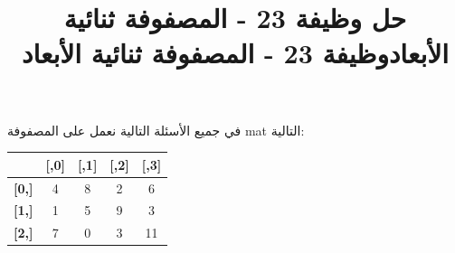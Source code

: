 \documentclass[14pt]{extarticle}
\title{حل وظيفة 23 - المصفوفة ثنائية الأبعاد}
\title{وظيفة 23 - المصفوفة ثنائية الأبعاد}
\begin{document}
\maketitle
\thispagestyle{fancy}

في جميع الأسئلة التالية نعمل على المصفوفة \textenglish{mat} التالية:

\begin{center}
\begin{english}
\begin{tabular}{c|cccc}
 & \textbf{[,0]} & \textbf{[,1]} & \textbf{[,2]} & \textbf{[,3]} \\
\hline
\textbf{[0,]} & 4  & 8  & 2  & 6  \\
\textbf{[1,]} & 1  & 5  & 9  & 3  \\
\textbf{[2,]} & 7  & 0  & 3  & 11 \\
\end{tabular}
\end{english}
\end{center}
\end{document}
